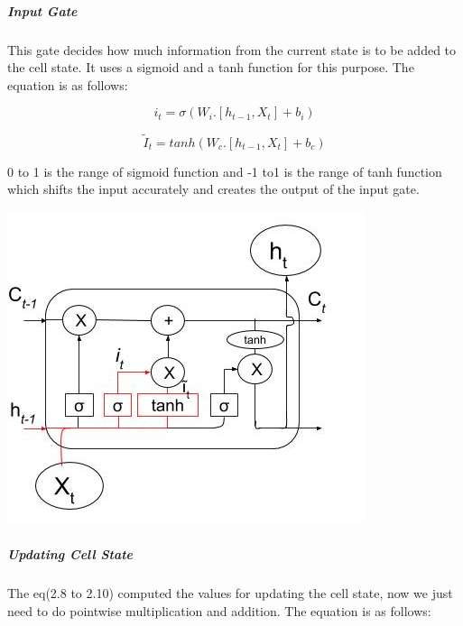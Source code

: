 \subparagraph{Input Gate}

This gate decides how much information from the current state is to be added to the cell state. It uses a sigmoid and a tanh function for this purpose. The equation is as follows:

\begin{equation}
	i_{t} = \sigma (W_{i} . [h_{t-1}, X_{t}] + b_{i})
\end{equation}

\begin{equation}
	\tilde{I}_{t} = tanh (W_{c} . [h_{t-1}, X_{t}] + b_{c})	
\end{equation}

0 to 1 is the range of sigmoid function and -1 to1 is the range of tanh function which shifts the input accurately and creates the output of the input gate.

				\begin{center}
				\includegraphics[width=\linewidth]{figures/Input-gate.jpg}	
				\label{fig: Input Gate}
				\end{center}

\subparagraph{Updating Cell State}

The eq(2.8 to 2.10) computed the values for updating the cell state, now we just need to do pointwise multiplication and addition. The equation is as follows:

